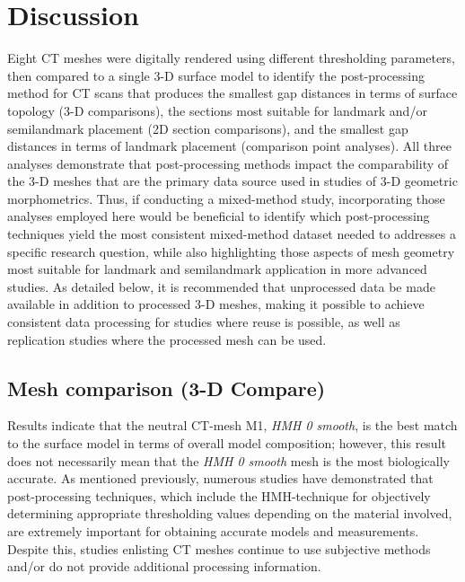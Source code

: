 \documentclass[review]{elsarticle}
\begin{document}
\section*{Discussion}

Eight CT meshes were digitally rendered using different thresholding parameters, then compared to a single 3-D surface model to identify the post-processing method for CT scans that produces the smallest gap distances in terms of surface topology (3-D comparisons), the sections most suitable for landmark and/or semilandmark placement (2D section comparisons), and the smallest gap distances in terms of landmark placement (comparison point analyses). All three analyses demonstrate that post-processing methods impact the comparability of the 3-D meshes that are the primary data source used in studies of 3-D geometric morphometrics. Thus, if conducting a mixed-method study, incorporating those analyses employed here would be beneficial to identify which post-processing techniques yield the most consistent mixed-method dataset needed to addresses a specific research question, while also highlighting those aspects of mesh geometry most suitable for landmark and semilandmark application in more advanced studies. As detailed below, it is recommended that unprocessed data be made available in addition to processed 3-D meshes, making it possible to achieve consistent data processing for studies where reuse is possible, as well as replication studies where the processed mesh can be used.

\subsection*{Mesh comparison (3-D Compare)}

Results indicate that the neutral CT-mesh M1, \textit{HMH 0 smooth}, is the best match to the surface model in terms of overall model composition; however, this result does not necessarily mean that the \textit{HMH 0 smooth} mesh is the most biologically accurate. As mentioned previously, numerous studies  \citep{RN11483,RN11485,RN11486} have demonstrated that post-processing techniques, which include the HMH-technique for objectively determining appropriate thresholding values depending on the material involved, are extremely important for obtaining accurate models and measurements. Despite this, studies enlisting CT meshes continue to use subjective methods and/or do not provide additional processing information.
\end{document}
